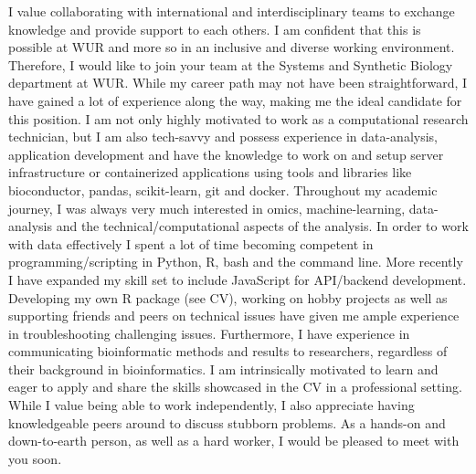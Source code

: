 \documentclass[11pt, a4paper]{awesome-cv}
\begin{document}
\begin{cvletter}
I value collaborating with international and interdisciplinary teams to exchange knowledge and provide support to each others.
I am confident that this is possible at WUR and more so in an inclusive and diverse working environment.
Therefore, I would like to join your team at the Systems and Synthetic Biology department at WUR.
While my career path may not have been straightforward, I have gained a lot of experience along the way, making me the ideal candidate for this position. 
I am not only highly motivated to work as a computational research technician, but I am also tech-savvy and possess experience in data-analysis, application development and have the knowledge to work on and setup server infrastructure or containerized applications using tools and libraries like bioconductor, pandas, scikit-learn, git and docker.
Throughout my academic journey, I was always very much interested in omics, machine-learning, data-analysis and the technical/computational aspects of the analysis.
In order to work with data effectively I spent a lot of time becoming competent in programming/scripting in Python, R, bash and the command line.
More recently I have expanded my skill set to include JavaScript for API/backend development.
Developing my own R package (see CV), working on hobby projects as well as supporting friends and peers on technical issues have given me ample experience in troubleshooting challenging issues. 
Furthermore, I have experience in communicating bioinformatic methods and results to researchers, regardless of their background in bioinformatics.
I am intrinsically motivated to learn and eager to apply and share the skills showcased in the CV in a professional setting. 
While I value being able to work independently, I also appreciate having knowledgeable peers around to discuss stubborn problems. 
As a hands-on and down-to-earth person, as well as a hard worker, I would be pleased to meet with you soon.
\end{cvletter}
\makeletterclosing
\end{document}
